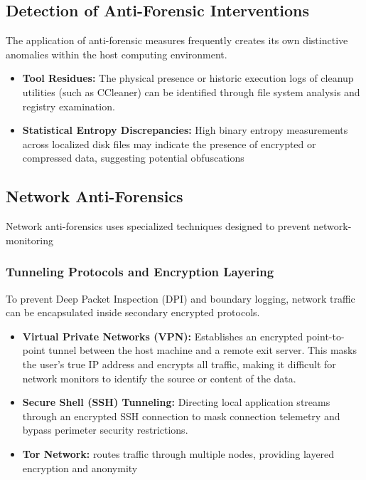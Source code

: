 \subsection{Detection of Anti-Forensic Interventions}

The application of anti-forensic measures frequently creates its own distinctive anomalies within the host computing environment.

\begin{itemize}
    \item \textbf{Tool Residues:} The physical presence or historic execution logs of cleanup utilities (such as CCleaner) can be identified through file system analysis and registry examination.
    \item \textbf{Statistical Entropy Discrepancies:} High binary entropy measurements across localized disk files may indicate the presence of encrypted or compressed data, suggesting potential obfuscations
\end{itemize}

\subsection{Network Anti-Forensics}

Network anti-forensics uses specialized techniques designed to prevent network-monitoring

\subsubsection*{Tunneling Protocols and Encryption Layering}
To prevent Deep Packet Inspection (DPI) and boundary logging, network traffic can be encapsulated inside secondary encrypted protocols.
\begin{itemize}
    \item \textbf{Virtual Private Networks (VPN):} Establishes an encrypted point-to-point tunnel between the host machine and a remote exit server. This masks the user's true IP address and encrypts all traffic, making it difficult for network monitors to identify the source or content of the data.
    \item \textbf{Secure Shell (SSH) Tunneling:} Directing local application streams through an encrypted SSH connection to mask connection telemetry and bypass perimeter security restrictions.
    \item \textbf{Tor Network:} routes traffic through multiple nodes, providing layered encryption and anonymity
\end{itemize}
